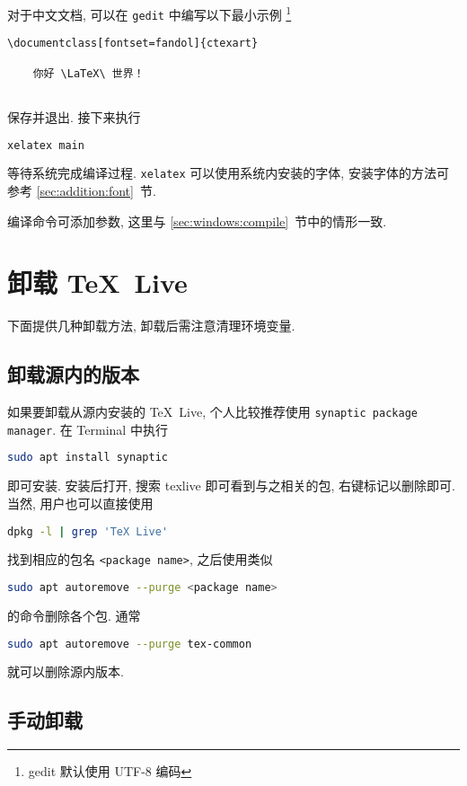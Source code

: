 对于中文文档, 可以在 \texttt{gedit} 中编写以下最小示例%
\footnote{gedit 默认使用 UTF-8 编码}%
\begin{lstlisting}[language={[LaTeX]TeX}]
  \documentclass[fontset=fandol]{ctexart}
  
    你好 \LaTeX\ 世界！
  
\end{lstlisting}
保存并退出.
接下来执行
\begin{lstlisting}[language=bash]
  xelatex main
\end{lstlisting}
等待系统完成编译过程.
\texttt{xelatex} 可以使用系统内安装的字体,
安装字体的方法可参考 \ref{sec:addition:font}~节.

编译命令可添加参数, 这里与 \ref{sec:windows:compile}~节中的情形一致.

\section{卸载 \TeX\ Live}\label{sec:ubuntu:uninstall}

下面提供几种卸载方法,
卸载后需注意清理环境变量.

\subsection{卸载源内的版本}\label{sec:ubuntu:aptremove}

如果要卸载从源内安装的 \TeX\ Live, 个人比较推荐使用 \texttt{synaptic package manager}.
在 \textsf{Terminal} 中执行
\begin{lstlisting}[language = bash]
  sudo apt install synaptic
\end{lstlisting}
即可安装.
安装后打开, 搜索 \textsf{texlive} 即可看到与之相关的包, 右键标记以删除即可.
当然, 用户也可以直接使用
\begin{lstlisting}[language = bash]
  dpkg -l | grep 'TeX Live'
\end{lstlisting}
找到相应的包名 \texttt{<package name>}, 之后使用类似
\begin{lstlisting}[language = bash]
  sudo apt autoremove --purge <package name>
\end{lstlisting}
的命令删除各个包.
通常
\begin{lstlisting}[language = bash]
  sudo apt autoremove --purge tex-common
\end{lstlisting}
就可以删除源内版本.

\subsection{手动卸载}

